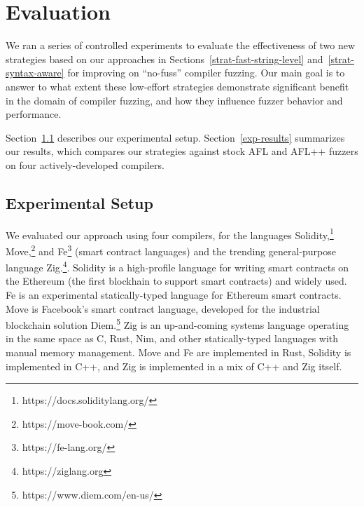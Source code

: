 \section{Evaluation}
\label{eval}

We ran a series of controlled experiments to evaluate the effectiveness of two
new strategies based on our approaches in Sections~\ref{strat-fast-string-level}
and~\ref{strat-syntax-aware} for improving on ``no-fuss'' compiler fuzzing. Our
main goal is to answer to what extent these low-effort strategies demonstrate
significant benefit in the domain of compiler fuzzing, and how they influence
fuzzer behavior and performance.

Section~\ref{exp-setup} describes our experimental setup.
Section~\ref{exp-results} summarizes our results, which compares our strategies
against stock AFL and AFL++ fuzzers on four actively-developed compilers. 

\subsection{Experimental Setup}
\label{exp-setup}

We evaluated our approach using four compilers, for the languages
Solidity,\footnote{https://docs.soliditylang.org/}
Move,\footnote{https://move-book.com/} and Fe\footnote{https://fe-lang.org/}
(smart contract languages) and the trending general-purpose language
Zig.\footnote{https://ziglang.org}.  
Solidity is a high-profile language for writing smart contracts on the Ethereum
(the first blockhain to support smart contracts) and widely used. Fe
is an experimental statically-typed language for Ethereum smart
contracts. Move is Facebook's smart contract language, developed for the
industrial blockchain solution Diem.\footnote{https://www.diem.com/en-us/} Zig
is an up-and-coming systems language operating in the same space as C, Rust,
Nim, and other statically-typed languages with manual memory management.
Move and Fe are implemented in Rust, Solidity is implemented in C++, and Zig is
implemented in a mix of C++ and Zig itself. 

